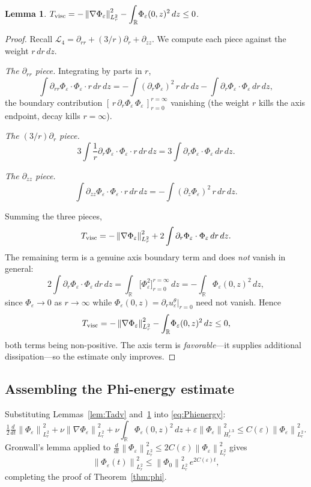 \documentclass{article}
\newtheorem{lemma}[theorem]{Lemma}
\theoremstyle{definition}
\theoremstyle{remark}
\newcommand{\R}{\mathbb{R}}
\newcommand{\e}{\varepsilon}
\newcommand{\half}{\tfrac{1}{2}}
\newcommand{\Lc}{\mathcal{L}}
\newcommand{\norm}[1]{\left\|#1\right\|}
\newcommand{\ddt}{\tfrac{d}{dt}}
\begin{document}
\begin{lemma}\label{lem:Tvisc}
  $T_{\rm visc}
  = -\norm{\nabla\Phi_\e}_{L^2_r}^2
  - \displaystyle\int_{\R}\!\Phi_\e(0,z)^2\,dz \le 0$.
\end{lemma}
\begin{proof}
  Recall $\Lc_4 = \partial_{rr} + (3/r)\partial_r + \partial_{zz}$.
  We compute each piece against the weight $r\,dr\,dz$.

  \medskip\noindent
  \emph{The $\partial_{rr}$ piece.}
  Integrating by parts in $r$,
  \[
    \int\partial_{rr}\Phi_\e\cdot\Phi_\e\cdot r\,dr\,dz
    = -\int(\partial_r\Phi_\e)^2\,r\,dr\,dz
      - \int\partial_r\Phi_\e\cdot\Phi_\e\,dr\,dz,
  \]
  the boundary contribution
  $[\,r\,\partial_r\Phi_\e\,\Phi_\e\,]_{r=0}^{r=\infty}$ vanishing (the
  weight $r$ kills the axis endpoint, decay kills $r=\infty$).

  \medskip\noindent
  \emph{The $(3/r)\partial_r$ piece.}
  \[
    3\int\frac{1}{r}\partial_r\Phi_\e\cdot\Phi_\e\cdot r\,dr\,dz
    = 3\int\partial_r\Phi_\e\cdot\Phi_\e\,dr\,dz.
  \]

  \medskip\noindent
  \emph{The $\partial_{zz}$ piece.}
  \[
    \int\partial_{zz}\Phi_\e\cdot\Phi_\e\cdot r\,dr\,dz
    = -\int(\partial_z\Phi_\e)^2\,r\,dr\,dz.
  \]

  Summing the three pieces,
  \[
    T_{\rm visc}
    = -\norm{\nabla\Phi_\e}_{L^2_r}^2
      + 2\int\partial_r\Phi_\e\cdot\Phi_\e\,dr\,dz .
  \]
  The remaining term is a genuine axis boundary term and does
  \emph{not} vanish in general:
  \[
    2\int\partial_r\Phi_\e\cdot\Phi_\e\,dr\,dz
    = \int_{\R}\!\bigl[\Phi_\e^2\bigr]_{r=0}^{r=\infty}\,dz
    = -\int_{\R}\!\Phi_\e(0,z)^2\,dz,
  \]
  since $\Phi_\e\to 0$ as $r\to\infty$ while
  $\Phi_\e(0,z) = \partial_r u^\theta_\e|_{r=0}$ need not vanish.  Hence
  \[
    T_{\rm visc} = -\norm{\nabla\Phi_\e}_{L^2_r}^2
    - \int_{\R}\!\Phi_\e(0,z)^2\,dz \le 0,
  \]
  both terms being non-positive.  The axis term is \emph{favorable}---it
  supplies additional dissipation---so the estimate only improves.
  \qedhere
\end{proof}

\subsection{Assembling the Phi-energy estimate}

Substituting Lemmas~\ref{lem:Tadv} and~\ref{lem:Tvisc} into
\eqref{eq:Phienergy}:
\begin{equation}\label{eq:phifull}
  \half\ddt\norm{\Phi_\e}_{L^2_r}^2
  + \nu\norm{\nabla\Phi_\e}_{L^2_r}^2
  + \nu\int_{\R}\!\Phi_\e(0,z)^2\,dz
  + \e\norm{\Phi_\e}_{\dot H^{1.3}_r}^2
  \le C(\e)\norm{\Phi_\e}_{L^2_r}^2.
\end{equation}
Gronwall's lemma applied to
$\ddt\norm{\Phi_\e}_{L^2_r}^2 \le 2C(\e)\norm{\Phi_\e}_{L^2_r}^2$ gives
\[
  \norm{\Phi_\e(t)}_{L^2_r}^2
  \le \norm{\Phi_0}_{L^2_r}^2\,e^{2C(\e)t},
\]
completing the proof of Theorem~\ref{thm:phi}.
\end{document}
